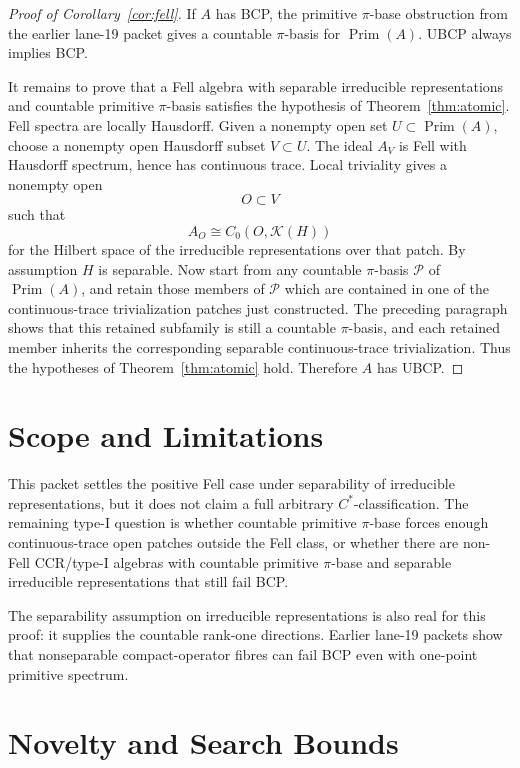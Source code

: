\documentclass[11pt]{article}
\newcommand{\Kcal}{\mathcal K}
\newcommand{\Prim}{\operatorname{Prim}}
\begin{document}
\begin{proof}[Proof of Corollary~\ref{cor:fell}]
If \(A\) has BCP, the primitive \(\pi\)-base obstruction from the earlier
lane-19 packet gives a countable \(\pi\)-basis for \(\Prim(A)\).  UBCP always
implies BCP.

It remains to prove that a Fell algebra with separable irreducible
representations and countable primitive \(\pi\)-basis satisfies the hypothesis
of Theorem~\ref{thm:atomic}.  Fell spectra are locally Hausdorff.  Given a
nonempty open set \(U\subset\Prim(A)\), choose a nonempty open Hausdorff
subset \(V\subset U\).  The ideal \(A_V\) is Fell with Hausdorff spectrum,
hence has continuous trace.  Local triviality gives a nonempty open
\[
        O\subset V
\]
such that
\[
        A_O\cong C_0(O,\Kcal(H))
\]
for the Hilbert space of the irreducible representations over that patch.
By assumption \(H\) is separable.  Now start from any countable \(\pi\)-basis
\(\mathcal P\) of \(\Prim(A)\), and retain those members of \(\mathcal P\)
which are contained in one of the continuous-trace trivialization patches just
constructed.  The preceding paragraph shows that this retained subfamily is
still a countable \(\pi\)-basis, and each retained member inherits the
corresponding separable continuous-trace trivialization.  Thus the hypotheses
of Theorem~\ref{thm:atomic} hold.
Therefore \(A\) has UBCP.
\end{proof}

\section*{Scope and Limitations}

This packet settles the positive Fell case under separability of irreducible
representations, but it does not claim a full arbitrary \(C^*\)-classification.
The remaining type-I question is whether countable primitive \(\pi\)-base
forces enough continuous-trace open patches outside the Fell class, or whether
there are non-Fell CCR/type-I algebras with countable primitive \(\pi\)-base
and separable irreducible representations that still fail BCP.

The separability assumption on irreducible representations is also real for
this proof: it supplies the countable rank-one directions.  Earlier lane-19
packets show that nonseparable compact-operator fibres can fail BCP even with
one-point primitive spectrum.

\section*{Novelty and Search Bounds}
\end{document}
